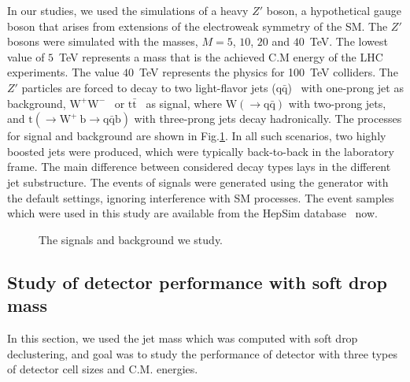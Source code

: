 \documentclass[12pt,twoside,a4paper,an,final]{cms-tdr}
\begin{document}
In our studies, we used the simulations of a heavy $Z'$ boson, a hypothetical gauge boson that arises from extensions of the electroweak symmetry of the SM.
The $Z'$ bosons were simulated with the masses, $M=5$, $10$, $20$ and $40$~TeV. The lowest value of $5$~TeV represents a mass that is the achieved C.M energy of the LHC experiments. The value $40$~TeV represents the physics for 100~TeV colliders. The $Z'$ particles are forced to decay to two light-flavor jets ($\mathrm{q\bar{q}}$)~\cite{Sirunyan:2018xlo} with one-prong jet as background, $\mathrm{W^+W^-}$~\cite{Sirunyan:2017acf}  or $\mathrm{t\bar{t}}$~\cite{Sirunyan:2018ryr} as signal, where $\mathrm{W(\rightarrow q\bar{q})}$ with two-prong jets, and $\mathrm{t (\rightarrow  W^+\>b \rightarrow q\bar{q} b)}$ with three-prong jets decay hadronically. The processes for signal and background are shown in Fig.\ref{fig:Process_SB}. In all such scenarios, two highly boosted jets were produced, which were typically back-to-back in the laboratory frame. The main difference between considered decay types lays in the different jet substructure. The events of signals were generated using the \pythia generator with the default settings, ignoring interference with SM processes. The event samples which were used in this study are available from the HepSim database~\cite{Chekanov:2014fga} now.

\begin{figure}
\begin{center}

\end{center}
\caption{The signals and background we study.}
\label{fig:Process_SB}
\end{figure}

\subsection{Study of detector performance with soft drop mass}
In this section, we used the jet mass which was computed with soft 
drop declustering, and goal was to study the performance of detector with three types of detector 
cell sizes and C.M. energies. 
\end{document}
